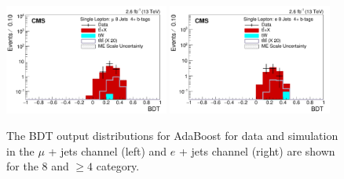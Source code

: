 \begin{figure}[ht!]
    \includegraphics[width=0.48\textwidth]{images/Run2/BDT_Mu29Aug400trees_5MinNodeSize_20nCuts_3MaxDepth_5adaboostbeta_adaBoost_alphaSTune_noMinEvents8nJets4nMtags_StackLogY.pdf}
    \includegraphics[width=0.48\textwidth]{images/Run2/BDT_El29Aug400trees_5MinNodeSize_20nCuts_3MaxDepth_5adaboostbeta_adaBoost_alphaSTune_noMinEvents8nJets4nMtags_StackLogY.pdf}
    \caption{The BDT output distributions for AdaBoost for data and simulation in the $\mu$ + jets channel (left) and $e$ + jets channel (right) are shown for the 8 \njets and $\geq4$ \nMtags category.}
    \label{fig:BDT_Mu29Aug400trees_5MinNodeSize_20nCuts_3MaxDepth_5adaboostbeta_adaBoost_alphaSTune_noMinEvents84}
\end{figure}

\newpage

